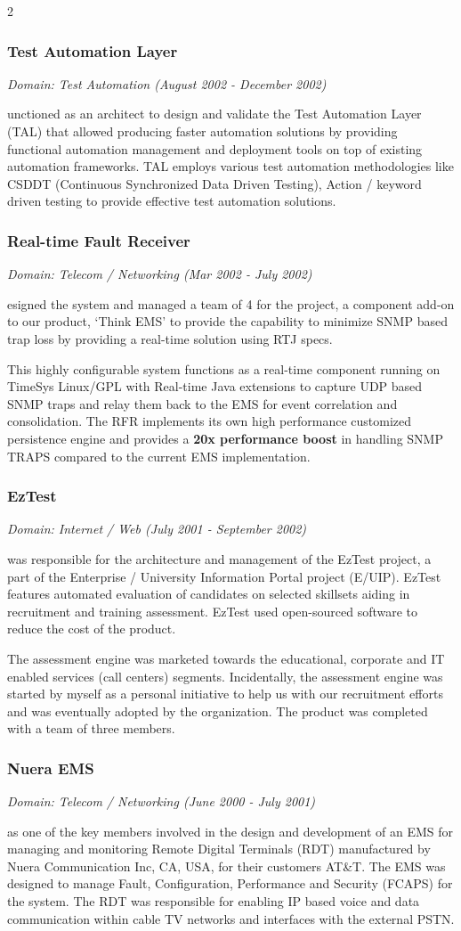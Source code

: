 \documentclass[a4paper,11pt]{article}
\newcommand\cvprojectentry[5]{
  \subsubsection*{#1}
  
  \vspace{-7pt}
  
  \it{Domain: #2}\normalfont{} \quad (#3 - #4)
  
}
\begin{document}
\begin{multicols}{2}
\cvprojectentry{Test Automation Layer}{Test Automation}{August 2002}{December 2002}

Functioned as an architect to design and validate the Test Automation
Layer (TAL) that allowed producing faster automation solutions by
providing functional automation management and deployment tools on top
of existing automation frameworks. TAL employs various test automation
methodologies like CSDDT (Continuous Synchronized Data Driven
Testing), Action / keyword driven testing to provide effective test
automation solutions.
 
\cvprojectentry{Real-time Fault Receiver}{Telecom / Networking}{Mar 2002}{July 2002}

Designed the system and managed a team of 4 for the project, a
component add-on to our product, `Think EMS' to provide the capability
to minimize SNMP based trap loss by providing a real-time solution
using RTJ specs.
 
This highly configurable system functions as a real-time component
running on TimeSys Linux/GPL with Real-time Java extensions to capture
UDP based SNMP traps and relay them back to the EMS for event
correlation and consolidation. The RFR implements its own high
performance customized persistence engine and provides a \textbf{20x
performance boost} in handling SNMP TRAPS compared to the current EMS
implementation.
 
\cvprojectentry{EzTest}{Internet / Web}{July 2001}{September 2002}
 
I was responsible for the architecture and management of the EzTest
project, a part of the Enterprise / University Information Portal
project (E/UIP). EzTest features automated evaluation of candidates on
selected skillsets aiding in recruitment and training
assessment. EzTest used open-sourced software to reduce the cost of
the product.
 
The assessment engine was marketed towards the educational, corporate
and IT enabled services (call centers) segments. Incidentally, the
assessment engine was started by myself as a personal initiative to
help us with our recruitment efforts and was eventually adopted by the
organization. The product was completed with a team of three members.
 
\cvprojectentry{Nuera EMS}{Telecom / Networking}{June 2000}{July 2001}

Was one of the key members involved in the design and development of
an EMS for managing and monitoring Remote Digital Terminals (RDT)
manufactured by Nuera Communication Inc, CA, USA, for their customers
AT\&T. The EMS was designed to manage Fault, Configuration, Performance
and Security (FCAPS) for the system. The RDT was responsible for
enabling IP based voice and data communication within cable TV
networks and interfaces with the external PSTN.
 

\end{multicols}
\end{document}
